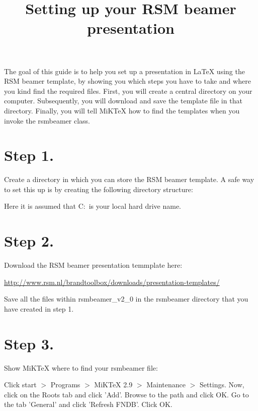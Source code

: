 \documentclass[11pt]{scrartcl}
\begin{document}

\title{Setting up your RSM beamer presentation}
\maketitle	

\noindent The goal of this guide is to help you set up a presentation in LaTeX using the RSM beamer template, by showing you which steps you have to take and where you kind find the required files. First, you will create a central directory on your computer. Subsequently, you will download and save the template file in that directory. Finally, you will tell MiKTeX how to find the templates when you invoke the rsmbeamer class.

\section*{Step 1.}
Create a directory in which you can store the RSM beamer template. A safe way to set this up is by creating the following directory structure: \vspace{1em}

\noindent{} \vspace{1em}

\noindent Here it is assumed that C:\ is your local hard drive name.

\section*{Step 2.}
Download the RSM beamer presentation temmplate here: \vspace{1em}

\noindent \url{http://www.rsm.nl/brandtoolbox/downloads/presentation-templates/} \vspace{1em}

\noindent Save all the files within rsmbeamer\_v2\_0 in the rsmbeamer directory that you have created in step 1.

\section*{Step 3.}
Show MiKTeX where to find your rsmbeamer file: \vspace{1em}

\noindent Click start $>$ Programs $>$ MiKTeX 2.9 $>$ Maintenance $>$ Settings. Now, click on the Roots tab and click 'Add'. Browse to the path  and click OK. Go to the tab 'General' and click 'Refresh FNDB'. Click OK.
\end{document}
